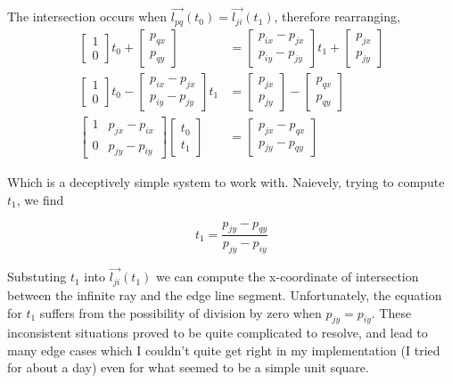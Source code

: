 \documentclass{article}
\begin{document}
The intersection occurs when $\vec{l_{pq}}(t_0) = \vec{l_{ji}}(t_1)$, therefore rearranging, 
\begin{align*}
\begin{bmatrix} 1 \\ 0 \end{bmatrix} t_0 + \begin{bmatrix} p_{qx} \\ p_{qy} \end{bmatrix} &= \begin{bmatrix} p_{ix} - p_{jx} \\ p_{iy} - p_{jy} \end{bmatrix} t_1 + \begin{bmatrix} p_{jx} \\ p_{jy} \end{bmatrix} \\
\begin{bmatrix} 1 \\ 0 \end{bmatrix} t_0 - \begin{bmatrix} p_{ix} - p_{jx} \\ p_{iy} - p_{jy} \end{bmatrix} t_1 &= \begin{bmatrix} p_{jx} \\ p_{jy} \end{bmatrix} - \begin{bmatrix} p_{qx} \\ p_{qy} \end{bmatrix} \\
\begin{bmatrix} 1 & p_{jx} - p_{ix} \\ 0 & p_{jy} - p_{iy} \end{bmatrix} \begin{bmatrix} t_0 \\ t_1 \end{bmatrix} &= \begin{bmatrix} p_{jx} - p_{qx} \\ p_{jy} - p_{qy} \end{bmatrix}
\end{align*}

Which is a deceptively simple system to work with. Naievely, trying to compute $t_1$, we find

\begin{equation}
t_1 = \frac{p_{jy} - p_{qy}}{p_{jy} - p_{iy}}
\end{equation}

Substuting $t_1$ into $\vec{l_{ji}}(t_1)$ we can compute the x-coordinate of intersection between the infinite ray and the edge line segment. Unfortunately, the equation for $t_1$ suffers from the possibility of division by zero when $p_{jy} = p_{iy}$. These inconsistent situations proved to be quite complicated to resolve, and lead to many edge cases which I couldn't quite get right in my implementation (I tried for about a day) even for what seemed to be a simple unit square. 
\end{document}
